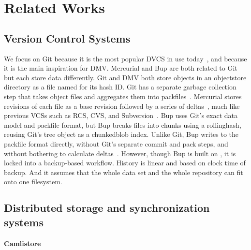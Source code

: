 \section{Related Works}


\subsection{Version Control Systems}

We focus on Git because it is the most popular \gls{DVCS} in use today~\cite{what_are_devs_talking_about}, and because it is the main inspiration for DMV.
Mercurial and Bup are both related to Git but each store data differently.
Git and DMV both store objects in an \gls{objectstore} directory as a file named for its hash ID.
Git has a separate garbage collection step that takes object files and aggregates them into \glspl{packfile}~\cite[Section 10.7]{git_book}.
Mercurial stores revisions of each file as a base revision followed by a series of deltas~\cite[Chapter 4]{hgbook}, much like previous \glspl{VCS} such as RCS, CVS, and Subversion~\cite{history_of_version_control}.
Bup uses Git's exact data model and \gls{packfile} format, but Bup breaks files into chunks using a \gls{rollinghash}, reusing Git's \gls{tree} object as a \gls{chunkedblob} index\footnotemark.
Unlike Git, Bup writes to the \gls{packfile} format directly, without Git's separate commit and pack steps, and without bothering to calculate deltas~\cite{bup_design}.
However, though Bup is built on , it is locked into a backup-based workflow.
History is linear and based on clock time of backup.
And it assumes that the whole data set and the whole \gls{repository} can fit onto one filesystem.



\subsection{Distributed storage and synchronization systems}

\paragraph{Camlistore}

